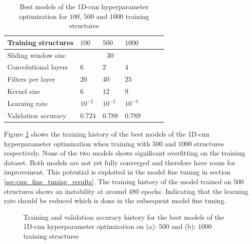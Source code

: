 \documentclass[conference]{IEEEtran}
\begin{document}
\begin{table}[htp]
	\centering
	\caption{Best models of the 1D-\gls{cnn} hyperparameter optimization for $ 100 $, $ 500 $ and $ 1000 $ training structures}
	\label{tab:hyperparameters_100_500_1000_structures_CNN}
	\begin{tabular}{l|llllll}
		Training structures & $ 100 $ & $ 500 $ & $ 1000 $ \\
		\hline
		Sliding window size & \multicolumn{3}{c}{$ 30 $} \\
		\hline
		Convolutional layers & $ 6 $ & $ 2 $ & $ 4 $ \\
		Filters per layer & $ 20 $ & $ 40 $ & $ 25 $ \\
		Kernel size & $ 6 $ & $ 12 $ & $ 9 $ \\
		Learning rate & $ 10^{-2} $ & $ 10^{-2} $ & $ 10^{-3} $ \\
		\hline
		Validation accuracy & $ 0.724 $ & $ 0.788 $ & $ 0.789 $
	\end{tabular}
\end{table}

Figure \ref{fig:accuracy_500_1000_structures_random_search_CNN} shows the training history of the best models of the 1D-\gls{cnn} hyperparameter optimization when training with $ 500 $ and $ 1000 $ structures respectively. None of the two models shows significant overfitting on the training dataset. Both models are not yet fully converged and therefore have room for improvement. This potential is exploited in the model fine tuning in section \ref{sec:cnn_fine_tuning_results}. The training history of the model trained on $ 500 $ structures shows an instability at around $ 480 $ epochs. Indicating that the learning rate should be reduced which is done in the subsequent model fine tuning.

\begin{figure}[htp]
	\centering
	\quad
	\caption{Training and validation accuracy history for the best models of the 1D-\gls{cnn} hyperparameter optimization on (a): $ 500 $ and (b): $ 1000 $ training structures}
	\label{fig:accuracy_500_1000_structures_random_search_CNN}
\end{figure}
\end{document}
